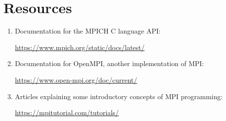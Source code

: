 \documentclass{article}
\begin{document}




\section{Resources}

\begin{enumerate}

\item Documentation for the MPICH C language API:

\url{https://www.mpich.org/static/docs/latest/}

\item Documentation for OpenMPI, another implementation of MPI:

\url{https://www.open-mpi.org/doc/current/}

\item \label{resource:mpitutorial} Articles explaining some introductory concepts of MPI programming:

\url{https://mpitutorial.com/tutorials/}
    
\end{enumerate}
\end{document}
